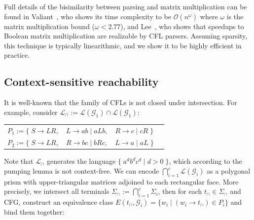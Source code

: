\documentclass[sigplan,nonacm]{acmart}\settopmatter{printfolios=false,printccs=false,printacmref=false}
\begin{document}
Full details of the bisimilarity between parsing and matrix multiplication can be found in Valiant~\cite{valiant1975general}, who shows its time complexity to be $\mathcal{O}(n^\omega)$ where $\omega$ is the matrix multiplication bound ($\omega < 2.77$), and Lee~\cite{lee2002fast}, who shows that speedups to Boolean matrix multiplication are realizable by CFL parsers. Assuming sparsity, this technique is typically linearithmic, and we show it to be highly efficient in practice.

\subsection{Context-sensitive reachability}\label{sec:cslr}

It is well-known that the family of CFLs is not closed under intersection. For example, consider $\mathcal{L}_\cap := \mathcal{L}(\mathcal{G}_1) \cap \mathcal{L}(\mathcal{G}_1)$:

\begin{table}[H]
  \begin{tabular}{llll}
    $P_1 := \big\{\;S \rightarrow L R,$ & $L \rightarrow a b \mid a L b,$ & $R \rightarrow c \mid c R\;\big\}$\vspace{5pt}\\
    $P_2 := \big\{\;S \rightarrow L R,$ & $R \rightarrow b c \mid b R c,$ & $L \rightarrow a \mid a L\;\big\}$
  \end{tabular}
\end{table}

\noindent Note that $\mathcal{L}_\cap$ generates the language $\big\{\;a^d b^d c^d \mid d > 0\;\big\}$, which according to the pumping lemma is not context-free. We can encode $\bigcap_{i=1}^c \mathcal{L}(\mathcal{G}_i)$ as a polygonal prism with upper-triangular matrices adjoined to each rectangular face. More precisely, we intersect all terminals $\Sigma_\cap := \bigcap_{i=1}^c \Sigma_i$, then for each $t_\cap \in \Sigma_\cap$ and CFG, construct an equivalence class $E(t_\cap, \mathcal{G}_i) = \{ w_i \mid (w_i \rightarrow t_\cap) \in P_i\}$ and bind them together:\vspace{-5pt}
\end{document}

